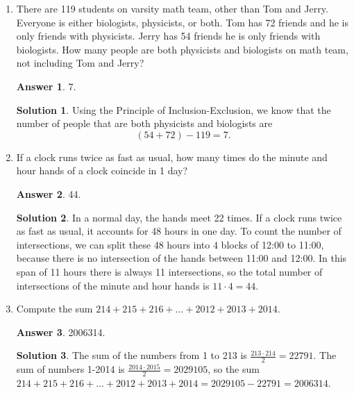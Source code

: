 \documentclass[11pt]{article}
\theoremstyle{definition}
\newtheorem*{solution}{Solution}
\newtheorem*{answer}{Answer}
\begin{document}
\begin{enumerate}
\item There are 119 students on varsity math team, other than Tom and Jerry. Everyone is either biologists, physicists, or both.  Tom has 72 friends and he is only friends with physicists. Jerry has 54 friends he is only friends with biologists. How many people are both physicists and biologists on math team, not including Tom and Jerry?
\begin{answer}
7.
\end{answer}
\begin{solution}
Using the Principle of Inclusion-Exclusion, we know that the number of people that are both physicists and biologists are
\[(54 + 72) - 119 = 7.\]
\end{solution}

\item If a clock runs twice as fast as usual, how many times do the minute and hour hands of a clock coincide in 1 day?
\begin{answer}
44.
\end{answer}
\begin{solution}
In a normal day, the hands meet 22 times. If a clock runs twice as fast as usual, it accounts for 48 hours in one day. To count the number of intersections, we can split these 48 hours into 4 blocks of 12:00 to 11:00, because there is no intersection of the hands between 11:00 and 12:00.  In this span of 11 hours there is always 11 intersections, so the total number of intersections of the minute and hour hands is $11 \cdot 4=44$.
\end{solution}

\item Compute the sum $214 + 215 + 216 + \ldots + 2012 + 2013 + 2014$.
\begin{answer}
2006314.
\end{answer}
\begin{solution}
The sum of the numbers from 1 to 213 is $\frac{213 \cdot 214}{2} = 22791$. The sum of numbers 1-2014 is $\frac{2014 \cdot 2015}{2} = 2029105$, so the sum $214 + 215 + 216 + ... + 2012 + 2013 + 2014 = 2029105 - 22791 = 2006314$.
\end{solution}

\end{enumerate}
\end{document}
